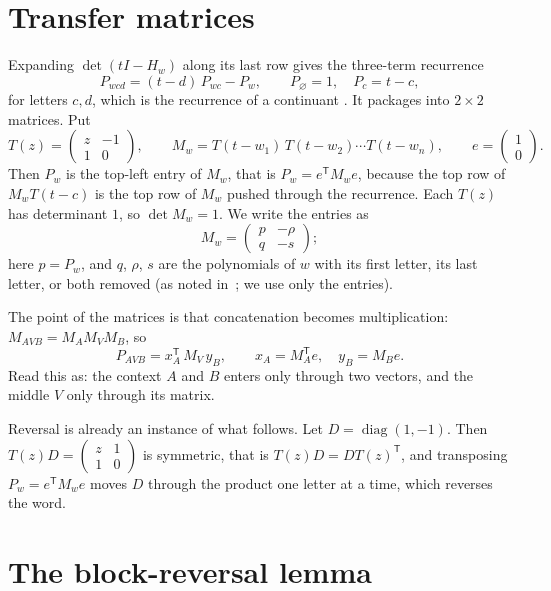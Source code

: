 \documentclass[11pt]{article}
\theoremstyle{remark}
\newcommand{\T}{^{\mathsf T}}
\begin{document}
\section{Transfer matrices}

Expanding $\det(tI-H_w)$ along its last row gives the three-term recurrence
\[
P_{wcd}=(t-d)\,P_{wc}-P_w ,\qquad P_\varnothing=1,\quad P_c=t-c ,
\]
for letters $c,d$, which is the recurrence of a continuant \cite[\S6.7]{GKP}. It packages into $2\times2$ matrices. Put
\[
T(z)=\begin{pmatrix} z&-1\\ 1&0\end{pmatrix},\qquad M_w=T(t-w_1)\,T(t-w_2)\cdots T(t-w_n),\qquad e=\begin{pmatrix}1\\0\end{pmatrix}.
\]
Then $P_w$ is the top-left entry of $M_w$, that is $P_w=e\T M_w e$, because the top row of $M_wT(t-c)$ is the top row
of $M_w$ pushed through the recurrence. Each $T(z)$ has determinant $1$, so $\det M_w=1$. We write the entries as
\[
M_w=\begin{pmatrix} p&-\rho\\ q&-s\end{pmatrix};
\]
here $p=P_w$, and $q$, $\rho$, $s$ are the polynomials of $w$ with its first letter, its last letter, or both removed
(as noted in~\cite{MOans}; we use only the entries).

The point of the matrices is that concatenation becomes multiplication: $M_{AVB}=M_AM_VM_B$, so
\begin{equation}\label{eq:split}
P_{AVB}=x_A\T\, M_V\, y_B ,\qquad x_A=M_A\T e,\quad y_B=M_Be .
\end{equation}
Read this as: the context $A$ and $B$ enters only through two vectors, and the middle $V$ only through its matrix.

Reversal is already an instance of what follows. Let $D=\operatorname{diag}(1,-1)$. Then
$T(z)D=\left(\begin{smallmatrix} z&1\\1&0\end{smallmatrix}\right)$ is symmetric, that is $T(z)D=DT(z)\T$, and
transposing $P_w=e\T M_we$ moves $D$ through the product one letter at a time, which reverses the word.

\section{The block-reversal lemma}
\end{document}
